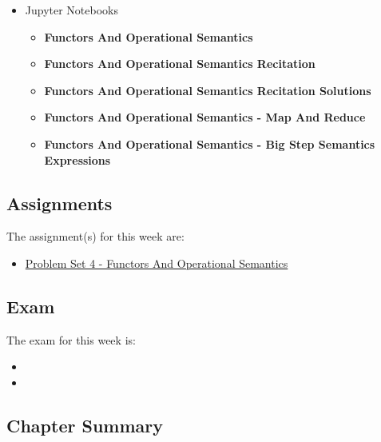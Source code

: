 \begin{itemize}
    \item Jupyter Notebooks
    \begin{itemize}
        \item \textbf{Functors And Operational Semantics}
        \item \textbf{Functors And Operational Semantics Recitation}
        \item \textbf{Functors And Operational Semantics Recitation Solutions}
        \item \textbf{Functors And Operational Semantics - Map And Reduce}
        \item \textbf{Functors And Operational Semantics - Big Step Semantics Expressions}
    \end{itemize}
\end{itemize}

\subsection{Assignments}

The assignment(s) for this week are:

\begin{itemize}
    \item \href{https://github.com/QuantumCompiler/CU/tree/main/CSPB%203155%20-%20Principles%20Of%20Programming%20Languages/Assignments/Problem%20Sets/Problem%20Set%204%20-%20Functors%20And%20Operational%20Semantics}{Problem Set 4 - Functors And Operational Semantics}
\end{itemize}

\subsection{Exam}

The exam for this week is:

\begin{itemize}
    \item {}
    \item {}
\end{itemize}

\newpage

\subsection{Chapter Summary}

